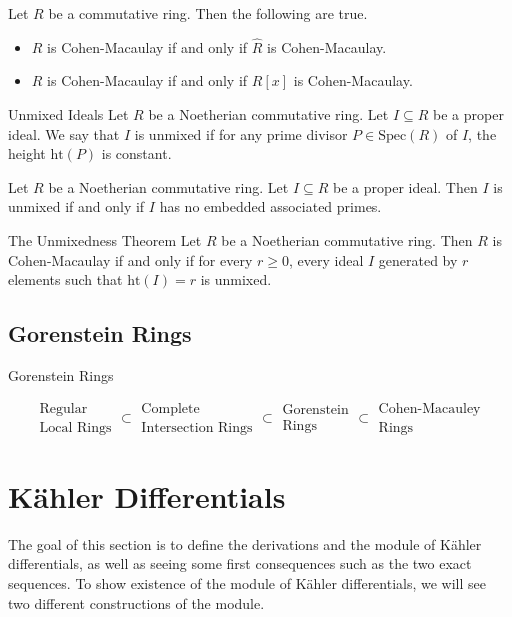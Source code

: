 \documentclass[a4paper]{article}
\begin{document}
\begin{prp}{}{} Let $R$ be a commutative ring. Then the following are true. 
\begin{itemize}
\item $R$ is Cohen-Macaulay if and only if $\widehat{R}$ is Cohen-Macaulay. 
\item $R$ is Cohen-Macaulay if and only if $R[x]$ is Cohen-Macaulay. 
\end{itemize}
\end{prp}

\begin{defn}{Unmixed Ideals}{} Let $R$ be a Noetherian commutative ring. Let $I\subseteq R$ be a proper ideal. We say that $I$ is unmixed if for any prime divisor $P\in\text{Spec}(R)$ of $I$, the height $\text{ht}(P)$ is constant. 
\end{defn}

\begin{lmm}{}{} Let $R$ be a Noetherian commutative ring. Let $I\subseteq R$ be a proper ideal. Then $I$ is unmixed if and only if $I$ has no embedded associated primes. 
\end{lmm}

\begin{thm}{The Unmixedness Theorem}{} Let $R$ be a Noetherian commutative ring. Then $R$ is Cohen-Macaulay if and only if for every $r\geq 0$, every ideal $I$ generated by $r$ elements such that $\text{ht}(I)=r$ is unmixed. 
\end{thm}

\subsection{Gorenstein Rings}
\begin{defn}{Gorenstein Rings}{}
\end{defn}


$$\substack{\text{Regular}\\\text{Local Rings}}\subset\substack{\text{Complete}\\\text{Intersection Rings}}\subset\substack{\text{Gorenstein}\\\text{Rings}}\subset\substack{\text{Cohen-Macauley}\\\text{Rings}}$$

\pagebreak
\section{Kähler Differentials}
The goal of this section is to define the derivations and the module of Kähler differentials, as well as seeing some first consequences such as the two exact sequences. To show existence of the module of Kähler differentials, we will see two different constructions of the module. 
\end{document}
